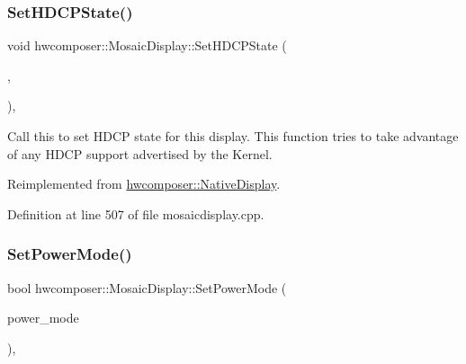 \subsubsection{\texorpdfstring{Set\+H\+D\+C\+P\+State()}{SetHDCPState()}}
{\footnotesize\ttfamily void hwcomposer\+::\+Mosaic\+Display\+::\+Set\+H\+D\+C\+P\+State (\begin{DoxyParamCaption}\item[{H\+W\+C\+Content\+Protection}]{,  }\item[{H\+W\+C\+Content\+Type}]{ }\end{DoxyParamCaption})\hspace{0.3cm}{\ttfamily [override]}, {\ttfamily [virtual]}}

Call this to set H\+D\+CP state for this display. This function tries to take advantage of any H\+D\+CP support advertised by the Kernel. 

Reimplemented from \mbox{\hyperlink{classhwcomposer_1_1NativeDisplay_ac65fa12ceb6737a2971cd2faa1a7785d}{hwcomposer\+::\+Native\+Display}}.



Definition at line 507 of file mosaicdisplay.\+cpp.


\begin{DoxyCode}{0}
\end{DoxyCode}
\mbox{\label{classhwcomposer_1_1MosaicDisplay_a001b4f2775a2a50d380ff6eb33ba3683}} 
\subsubsection{\texorpdfstring{Set\+Power\+Mode()}{SetPowerMode()}}
{\footnotesize\ttfamily bool hwcomposer\+::\+Mosaic\+Display\+::\+Set\+Power\+Mode (\begin{DoxyParamCaption}\item[{uint32\+\_\+t}]{power\+\_\+mode }\end{DoxyParamCaption})\hspace{0.3cm}{\ttfamily [override]}, {\ttfamily [virtual]}}



